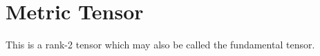 % 
% 
% 




\section{Metric Tensor\label{secMetricTensor}}

 This is a rank-2 tensor which may also be called the fundamental
tensor.

